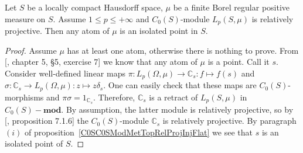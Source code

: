 \begin{proposition}\label{AtomsOfRelProjLpMod} Let $S$ be a locally compact
Hausdorff space, $\mu$ be a finite Borel regular positive measure on $S$. Assume
$1\leq p\leq+\infty$ and $C_0(S)$-module $L_p(S,\mu)$ is relatively projective.
Then any atom of $\mu$ is an isolated point in $S$.
\end{proposition} 
\begin{proof} Assume $\mu$ has at least one atom, otherwise there is nothing to
prove. From [\cite{BourbElemMathIntegLivVI}, chapter 5, \S 5, exercise 7] we
know that any atom of $\mu$ is a point. Call it $s$. Consider well-defined
linear maps $\pi:L_p(\Omega,\mu)\to\mathbb{C}_s:f\mapsto f(s)$ and
$\sigma:\mathbb{C}_s\to L_p(\Omega,\mu):z\mapsto z\delta_s$. One can easily
check that these maps are $C_0(S)$-morphisms and $\pi\sigma=1_{\mathbb{C}_s}$.
Therefore, $\mathbb{C}_s$ is a retract of $L_p(S,\mu)$ in $C_0(S)-\mathbf{mod}$.
By assumption, the latter module is relatively projective, so by
[\cite{HelBanLocConvAlg}, proposition 7.1.6] the $C_0(S)$-module $\mathbb{C}_s$
is relatively projective. By paragraph $(i)$ of
proposition~\ref{C0SC0SModMetTopRelProjInjFlat} we see that $s$ is an isolated
point of $S$.
\end{proof}

